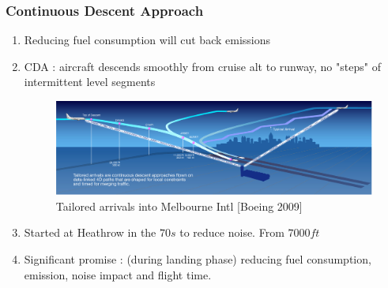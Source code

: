 \documentclass{beamer}
\begin{document}

\begin{frame}
\frametitle{Continuous Descent Approach}

\begin{enumerate}[1.]
\item Reducing fuel consumption will cut back emissions
\item CDA : aircraft descends smoothly from cruise alt to runway, no "steps" of intermittent level segments


\begin{figure}[h!]
\centering
\includegraphics[width=1\textwidth]{./figures/Tailored_Arrivals_YMML.jpg}\\
{\tiny {Tailored arrivals into Melbourne Intl [Boeing 2009]}}
\end{figure}

\item Started at Heathrow in the $70s$ to reduce noise. From $7000ft$

\item Significant promise : (during landing phase) reducing fuel consumption, emission, noise impact and flight time.

\end{enumerate}

\end{frame}

\end{document}
